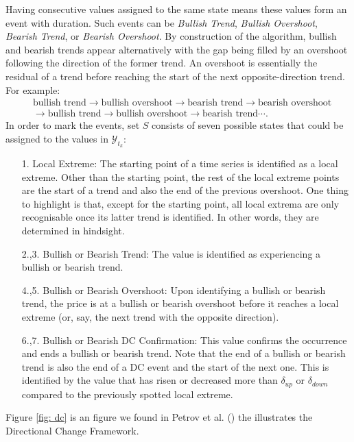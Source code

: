 Having consecutive values assigned to the same state means these values form an event with duration. Such events can be \textit{Bullish Trend}, \textit{Bullish Overshoot}, \textit{Bearish Trend}, or \textit{Bearish Overshoot}. By construction of the algorithm, bullish and bearish trends appear alternatively with the gap being filled by an overshoot following the direction of the former trend. An overshoot is essentially the residual of a trend before reaching the start of the next opposite-direction trend. For example:
\begin{align*}
    &\text{bullish trend} \rightarrow \text{bullish overshoot} \rightarrow \text{bearish trend} \rightarrow \text{bearish overshoot} \\
    & \rightarrow \text{bullish trend} \rightarrow \text{bullish overshoot} \rightarrow \text{bearish trend} \cdots.
\end{align*}
In order to mark the events, set $S$ consists of seven possible states that could be assigned to the values in $\mathcal{Y}_{t_k}$:
\begin{enumerate}
    \item[1.] Local Extreme: The starting point of a time series is identified as a local extreme. Other than the starting point, the rest of the local extreme points are the start of a trend and also the end of the previous overshoot. One thing to highlight is that, except for the starting point, all local extrema are only recognisable once its latter trend is identified. In other words, they are determined in hindsight.
    \item[2.,3.] Bullish or Bearish Trend: The value is identified as experiencing a bullish or bearish trend.
    \item[4.,5.] Bullish or Bearish Overshoot: Upon identifying a bullish or bearish trend, the price is at a bullish or bearish overshoot before it reaches a local extreme (or, say, the next trend with the opposite direction).
    \item[6.,7.] Bullish or Bearish DC Confirmation: This value confirms the occurrence and ends a bullish or bearish trend. Note that the end of a bullish or bearish trend is also the end of a DC event and the start of the next one. This is identified by the value that has risen or decreased more than $\delta_{up}$ or $\delta_{down}$ compared to the previously spotted local extreme.
\end{enumerate}
Figure \ref{fig: dc} is an figure we found in Petrov et al. (\citeyear{petrov2018agent}) the illustrates the Directional Change Framework.
